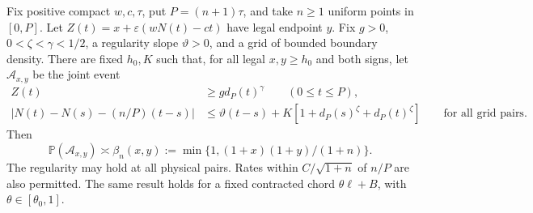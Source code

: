 \begin{theorem}
\label{bridge:ordinary-strong}
Fix positive compact $w,c,\tau$, put $P=(n+1)\tau$, and take $n\ge1$
uniform points in $[0,P]$. Let $Z(t)=x+\varepsilon(wN(t)-ct)$ have
legal endpoint $y$. Fix $g>0$, $0<\zeta<\gamma<1/2$, a regularity
slope $\vartheta>0$, and a grid of bounded boundary density. There
are fixed $h_0,K$ such that, for all legal $x,y\ge h_0$ and both signs,
let $\mathcal A_{x,y}$ be the joint event
\begin{align*}
 Z(t)&\ge gd_P(t)^\gamma\qquad(0\le t\le P),\\
 |N(t)-N(s)-(n/P)(t-s)|
 &\le\vartheta(t-s)+K[1+d_P(s)^\zeta+d_P(t)^\zeta]
 \qquad\text{for all grid pairs}.
\end{align*}
Then
\begin{equation}
 \mathbb P(\mathcal A_{x,y})\asymp\beta_n(x,y):=
       \min\{1,(1+x)(1+y)/(1+n)\}.
 \label{bridge:ordinary-strong-eq}
\end{equation}
The regularity may hold at all physical pairs. Rates within
$C/\sqrt{1+n}$ of $n/P$ are also permitted. The same result holds
for a fixed contracted chord $\theta\ell+B$, with
$\theta\in[\theta_0,1]$.
\end{theorem}
